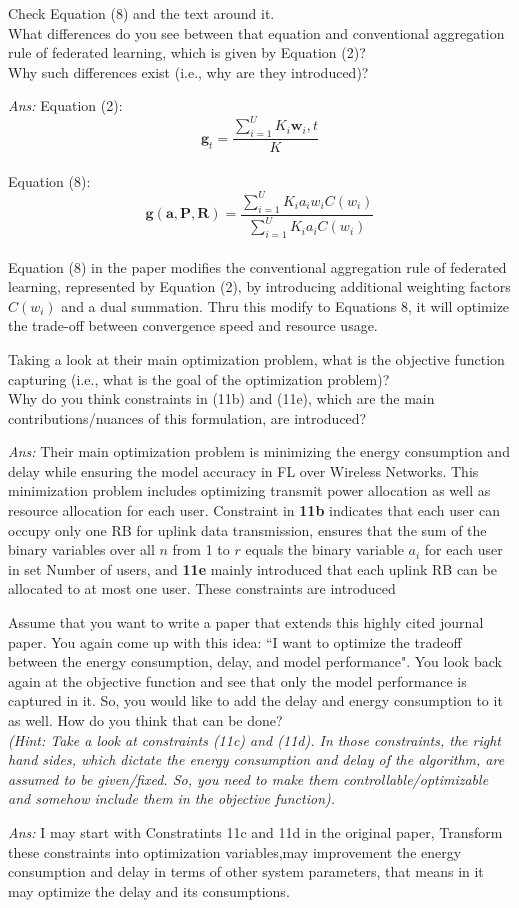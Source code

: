 \documentclass{article} %
\begin{document}
\begin{question}
Check Equation (8) and the text around it.\\ What differences do you see between that
equation and conventional aggregation rule of federated learning, which is given by
Equation (2)?\\ Why such differences exist (i.e., why are they introduced)?
\end{question}
\textit{Ans: }
Equation (2):
$$
\mathbf{g}_t = \frac{\sum_{i=1}^{U} K_i \mathbf{w}_i,t}{K}
$$
\\
Equation (8):
$$
\mathbf{g}(\mathbf{a}, \mathbf{P}, \mathbf{R}) = \frac{\sum_{i=1}^{U} K_i a_i w_i C(w_i)}{\sum_{i=1}^{U} K_i a_i C(w_i)}
$$
\\
Equation (8) in the paper modifies the conventional aggregation rule of federated learning, represented by Equation (2), by introducing additional weighting factors $C(w_i)$ and a dual summation. Thru this modify to Equations 8, it will optimize the trade-off between convergence speed and resource usage.


\begin{question}
Taking a look at their main optimization problem, what is the objective function capturing (i.e., what is the goal of the optimization problem)?\\ Why do you think constraints in (11b) and (11e), which are the main contributions/nuances of this formulation, are introduced?
\end{question}
\textit{Ans: }Their main optimization problem is minimizing the energy consumption and delay while ensuring the model accuracy in FL over Wireless Networks. This minimization problem includes optimizing transmit power allocation as well as resource allocation for each user. Constraint in \textbf{11b} indicates that each user can occupy only one RB for uplink data transmission, ensures that the sum of the binary variables over all $n$ from 1 to $r$ equals the binary variable $a_i$ for each user in set Number of users, and \textbf{11e} mainly introduced that each uplink RB can be allocated to at most one user. These constraints are introduced 

\begin{question}
Assume that you want to write a paper that extends this highly cited journal paper. You
again come up with this idea: “I want to optimize the tradeoff between the energy consumption, delay, and model performance". You look back again at the objective function and see that only the model performance is captured in it. So, you would like to add the
delay and energy consumption to it as well. How do you think that can be done?\\ \textit{(Hint:
Take a look at constraints (11c) and (11d). In those constraints, the right hand sides,
which dictate the energy consumption and delay of the algorithm, are assumed to be
given/fixed. So, you need to make them controllable/optimizable and somehow include
them in the objective function).}
\end{question}
\textit{Ans: }I may start with Constratints 11c and 11d in the original paper, Transform these constraints into optimization variables,may improvement the energy consumption and delay in terms of other system parameters, that means in it may optimize the delay and its consumptions.
\end{document}
